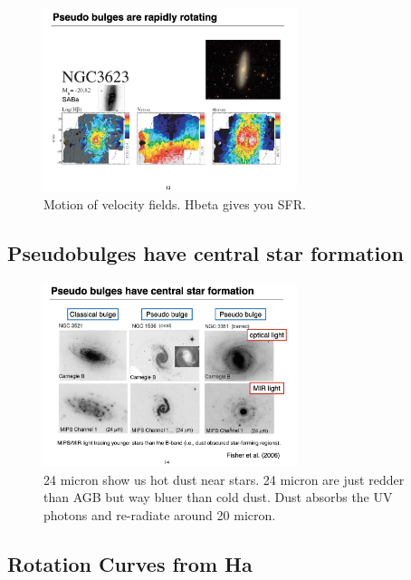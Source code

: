\documentclass{article}
\begin{document}
\begin{figure}
    \centering
    \includegraphics[width=0.66\textwidth]{figs/Screen Shot 2021-10-22 at 10.05.24 AM.png}
    \caption{Motion of velocity fields. Hbeta gives you SFR. }
    \label{fig:NGC3623}
\end{figure}

\subsection{Pseudobulges have central star formation}

\begin{figure}
    \centering
    \includegraphics[width=0.66\textwidth]{figs/Screen Shot 2021-10-22 at 10.07.31 AM.png}
    \caption{24 micron show us hot dust near stars. 24 micron are just redder than AGB but way bluer than cold dust. Dust absorbs the UV photons and re-radiate around 20 micron.}
    \label{fig:dust_in_bulges}
\end{figure}

\subsection{Rotation Curves from Ha}
\end{document}

